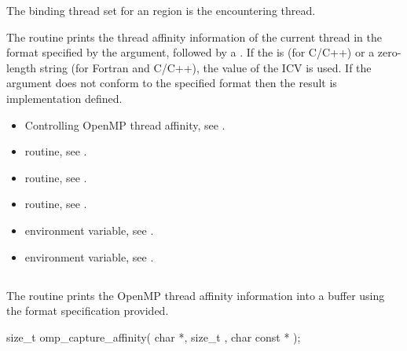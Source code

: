 \binding
The binding thread set for an  region 
is the encountering thread.

\effect
The  routine prints the thread affinity 
information of the current thread in the format specified by the 
 argument, followed by a . If the 
 is  (for C/C++) or a zero-length string
(for Fortran and C/C++), the value of the  ICV is used.
If the  argument does not conform to the specified format
then the result is implementation defined.

\crossreferences
\begin{itemize}
\item Controlling OpenMP thread affinity, see
.

\item {} routine, 
see .

\item {} routine, 
see .

\item {} routine, see .

\item {} environment variable, see
.

\item {} environment variable, see
.
\end{itemize}


\subsection{}
\label{subsec:omp_capture_affinity}

\summary
The  routine prints the OpenMP thread 
affinity information into a buffer using the format specification provided.


\format
\begin{ccppspecific}
\begin{ompcFunction}
size_t omp_capture_affinity(
  char *,
  size_t ,
  char const *
);
\end{ompcFunction}
\end{ccppspecific}

